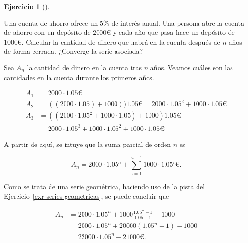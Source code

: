 \documentclass[
  a4paper,
]{scrreport}
\theoremstyle{definition}
\newtheorem{exercise}{Ejercicio}[chapter]
\theoremstyle{remark}
\begin{document}
\begin{exercise}[]\protect\hypertarget{exr-cuenta-ahorro}{}\label{exr-cuenta-ahorro}

Una cuenta de ahorro ofrece un \(5\)\% de interés anual. Una persona
abre la cuenta de ahorro con un depósito de \(2000\)€ y cada año que
pasa hace un depósito de \(1000\)€. Calcular la cantidad de dinero que
habrá en la cuenta después de \(n\) años de forma cerrada. ¿Converge la
serie asociada?

\end{exercise}

\begin{tcolorbox}[enhanced jigsaw, rightrule=.15mm, opacityback=0, bottomtitle=1mm, titlerule=0mm, toprule=.15mm, breakable, colframe=quarto-callout-tip-color-frame, left=2mm, opacitybacktitle=0.6, title=\textcolor{quarto-callout-tip-color}{\faLightbulb}\hspace{0.5em}{Solución}, toptitle=1mm, colback=white, colbacktitle=quarto-callout-tip-color!10!white, arc=.35mm, bottomrule=.15mm, coltitle=black, leftrule=.75mm]

Sea \(A_n\) la cantidad de dinero en la cuenta tras \(n\) años. Veamos
cuáles son las cantidades en la cuenta durante los primeros años.

\begin{align*}
A_1 &= 2000\cdot 1.05 \mbox{€}\\ 
A_2 &= ((2000\cdot 1.05) + 1000))1.05\mbox{€} = 2000\cdot 1.05^2 + 1000\cdot 1.05\mbox{€}\\ 
A_3 &= ((2000\cdot 1.05^2 + 1000\cdot 1.05)+1000)1.05\mbox{€}\\ 
&= 2000\cdot 1.05^3 + 1000\cdot 1.05^2 + 1000\cdot 1.05\mbox{€}
\vdots
\end{align*}

A partir de aquí, se intuye que la suma parcial de orden \(n\) es

\[
A_n = 2000\cdot 1.05^n + \sum_{i=1}^{n-1} 1000\cdot 1.05^i\mbox{€}.
\]

Como se trata de una serie geométrica, haciendo uso de la pista del
Ejercicio~\ref{exr-series-geometricas}, se puede concluir que

\begin{align*}
A_n &= 2000\cdot 1.05^n + 1000\frac{1.05^n-1}{1.05-1} - 1000\\ 
&= 2000\cdot 1.05^n + 20000 (1.05^n-1) - 1000\\ 
 &= 22000\cdot 1.05^n-21000\mbox{€}.
\end{align*}

\end{tcolorbox}
\end{document}
